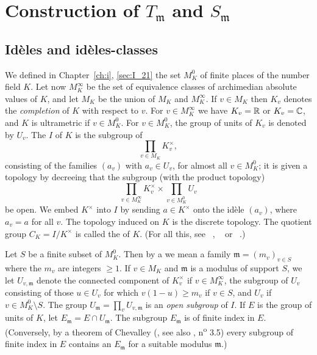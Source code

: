 \section{Construction of \texorpdfstring{$T_{\mathfrak{m}}$}{Tm} and
\texorpdfstring{$S_{\mathfrak{m}}$}{Sm}}
\label{sec:II_2}

\subsection{Idèles and idèles-classes}
\label{sec:II_21}
We defined in Chapter~\ref{ch:i}, \ref{sec:I_21} the set $M_K^0$ of finite
places of the number field $K$. Let now $M_K^\infty$
be the set of equivalence classes of archimedian absolute values of $K$, and
let $M_K$ be the union of $M_K$ and $M_K^\infty$. If $v \in
M_K$ then $K_v$ denotes the \emph{completion} of $K$ with respect to $v$. For
$v \in M_K^\infty$ we have $K_v = \mathbb{R}$ or $K_v = \mathbb{C}$, and $K$ is ultrametric if
$v \in M_K^0$. For $v \in M_K^0$, the group of units of $K_v$ is denoted by
$U_v$. The  $I$
of $K$ is the subgroup of
\[
	\prod_{v \in M_K} K_v^\times,
\]
consisting of the families $(a_v)$ with $a_v \in U_v$, for almost all $v \in
M_K^0$; it is given a topology by decreeing that the subgroup (with the product
topology)
\[
	\prod_{v \in M_K^\infty} K_v^\times \times \prod_{v \in M_K^0} U_v
\]
be open. We embed $K^\times$ into $I$ by sending $a \in K^\times$ onto the
idèle $(a_v)$, where $a_v = a$ for all $v$. The topology induced on $K$ is the
discrete topology. The quotient group $C_K = I/K^\times$ is called the  of
$K$.
(For all this, see \citeauthor{6}~\cite{6}, \citeauthor{13}~\cite{13} or
\citeauthor{44}~\cite{44}.)

Let $S$ be a finite subset of $M_K^0$.
\dpage
Then by a  we mean a family $\mathfrak{m} =
(m_v)_{v\in S}$ where the $m_v$ are integers $\ge 1$.  If $v \in M_K$ and
$\mathfrak{m}$ is a modulus of support $S$, we let $U_{v, \mathfrak{m}}$%
 denote the connected component of
$K_v^\times$ if $v \in M_K^\infty$, the subgroup of $U_v$ consisting of those
$u \in U_v$ for which $v(1-u) \ge m_v$ if $v \in S$, and $U_v$ if $v \in M_K^0
\setminus S$. The group $U_{\mathfrak{m}} = \prod_{v} U_{v, \mathfrak{m}}$ is
an \emph{open subgroup} of $I$.  If $E$ is the group of units of $K$, let
$E_{\mathfrak{m}} = E \cap U_{\mathfrak{m}}$. The
subgroup $E_{\mathfrak{m}}$ is of finite index in $E$.
(Conversely, by a theorem of Chevalley (\cite{8}, see also \cite{24},
n\textsuperscript{o} 3.5) every subgroup of finite index in $E$ contains an
$E_{\mathfrak{m}}$ for a suitable modulus $\mathfrak{m}$.)

